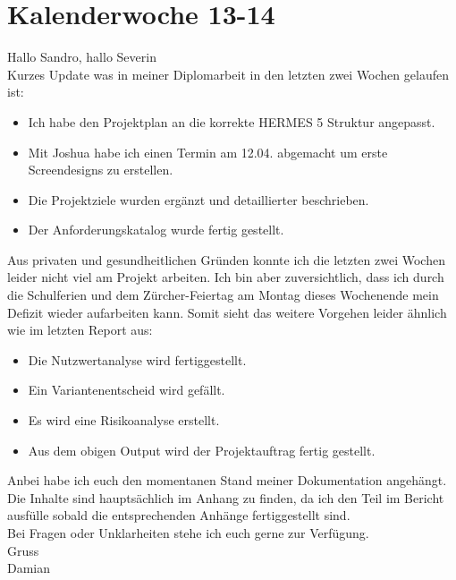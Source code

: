 \section{Kalenderwoche 13-14}

Hallo Sandro, hallo Severin\\

\noindent
Kurzes Update was in meiner Diplomarbeit in den letzten zwei Wochen
gelaufen ist:

\begin{itemize}
  \item{}
    Ich habe den Projektplan an die korrekte HERMES 5 Struktur
    angepasst.
  \item{}
    Mit Joshua habe ich einen Termin am 12.04. abgemacht um
    erste Screendesigns zu erstellen.
  \item{}
    Die Projektziele wurden ergänzt und detaillierter
    beschrieben.
  \item{}
    Der Anforderungskatalog wurde fertig gestellt.
\end{itemize}

\noindent
Aus privaten und gesundheitlichen Gründen konnte ich die letzten zwei
Wochen leider nicht viel am Projekt arbeiten.
Ich bin aber zuversichtlich, dass ich durch die Schulferien und dem
Zürcher-Feiertag am Montag dieses Wochenende mein Defizit wieder
aufarbeiten kann.
Somit sieht das weitere Vorgehen leider ähnlich wie im letzten Report aus:

\begin{itemize}
  \tightlist{}
  \item{}
    Die Nutzwertanalyse wird fertiggestellt.
  \item{}
    Ein Variantenentscheid wird gefällt.
  \item{}
    Es wird eine Risikoanalyse erstellt.
  \item{}
    Aus dem obigen Output wird der Projektauftrag fertig gestellt.
\end{itemize}

\noindent
Anbei habe ich euch den momentanen Stand meiner Dokumentation angehängt.
Die Inhalte sind hauptsächlich im Anhang zu finden, da ich den Teil im
Bericht ausfülle sobald die entsprechenden Anhänge fertiggestellt sind.\\

\noindent
Bei Fragen oder Unklarheiten stehe ich euch gerne zur Verfügung.\\

\noindent
Gruss\\
Damian
